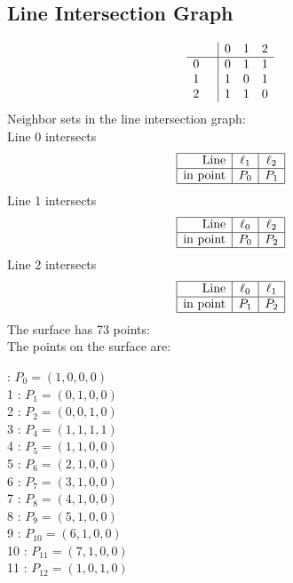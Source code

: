 \documentclass{article}
\begin{document}
{\subsection*{Line Intersection Graph}
{\arraycolsep=1pt
$$
\begin{array}{rr|*{3}r}
 &  & 0 & 1 & 2\\
\hline
0 &  & 0 & 1 & 1\\
1 &  & 1 & 0 & 1\\
2 &  & 1 & 1 & 0\\
\end{array}
$$
}%
Neighbor sets in the line intersection graph:\\
Line 0 intersects 
$$
\begin{array}{|r*{2}{|c}|}
\hline
\mbox{Line}  & \ell_{1} & \ell_{2}\\
\hline
\mbox{in point}  & P_{0} & P_{1}\\
\hline
\end{array}
$$
Line 1 intersects 
$$
\begin{array}{|r*{2}{|c}|}
\hline
\mbox{Line}  & \ell_{0} & \ell_{2}\\
\hline
\mbox{in point}  & P_{0} & P_{2}\\
\hline
\end{array}
$$
Line 2 intersects 
$$
\begin{array}{|r*{2}{|c}|}
\hline
\mbox{Line}  & \ell_{0} & \ell_{1}\\
\hline
\mbox{in point}  & P_{1} & P_{2}\\
\hline
\end{array}
$$
The surface has 73 points:\\
The points on the surface are:\\
\begin{multicols}{3}
 : $P_{0}=( 1, 0, 0, 0 )$\\
1 : $P_{1}=( 0, 1, 0, 0 )$\\
2 : $P_{2}=( 0, 0, 1, 0 )$\\
3 : $P_{4}=( 1, 1, 1, 1 )$\\
4 : $P_{5}=( 1, 1, 0, 0 )$\\
5 : $P_{6}=( 2, 1, 0, 0 )$\\
6 : $P_{7}=( 3, 1, 0, 0 )$\\
7 : $P_{8}=( 4, 1, 0, 0 )$\\
8 : $P_{9}=( 5, 1, 0, 0 )$\\
9 : $P_{10}=( 6, 1, 0, 0 )$\\
10 : $P_{11}=( 7, 1, 0, 0 )$\\
11 : $P_{12}=( 1, 0, 1, 0 )$\\

\end{multicols}}
\end{document}
